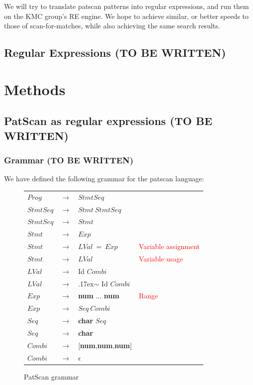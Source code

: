 \documentclass[12pt]{article}
\theoremstyle{definition}
\begin{document}
We will try to translate patscan patterns into regular expressions, and run them on the KMC group's RE engine. We hope to achieve similar, or better speeds to those of scan-for-matches, while also achieving the same search results.

\subsection{Regular Expressions (TO BE WRITTEN)}

\section{Methods}
\subsection{PatScan as regular expressions (TO BE WRITTEN)}

\subsubsection{Grammar (TO BE WRITTEN)}
\label{Patscan grammar}

We have defined the following grammar for the patscan language:

\begin{figure}[H]
\begin{tabular}{|lcll|}
	\hline
	$Prog$ & $\rightarrow$ & $StmtSeq$ & \\
	$StmtSeq$ & $\rightarrow$ & $Stmt\ StmtSeq$ & \\
	$StmtSeq$ & $\rightarrow$ & $Stmt$ & \\
	$Stmt$ & $\rightarrow$ & $Exp$ & \\
	$Stmt$ & $\rightarrow$ & $LVal\ =\ Exp$ &  \textcolor{red}{Variable assignment} \\
	$Stmt$ & $\rightarrow$ & $LVal$ & \textcolor{red}{Variable usage} \\
	$LVal$ & $\rightarrow$ & Id $Combi$ & \\
	$LVal$ & $\rightarrow$ & {\raise.17ex\hbox{$\scriptstyle\mathtt{\sim}$}} Id $Combi$ & \\
	$Exp$ & $\rightarrow$ & \textbf{num} ... \textbf{num} & \textcolor{red}{Range} \\
	$Exp$ & $\rightarrow$ & $Seq\ Combi$ & \\
	$Seq$ & $\rightarrow$ & \textbf{char} $Seq$ & \\
	$Seq$ & $\rightarrow$ & \textbf{char} & \\
	$Combi$ & $\rightarrow$ & [\textbf{num},\textbf{num},\textbf{num}] & \\
	$Combi$ & $\rightarrow$ & $\epsilon$ & \\
	\hline
\end{tabular}
\caption{PatScan grammar}
\end{figure}
\end{document}
